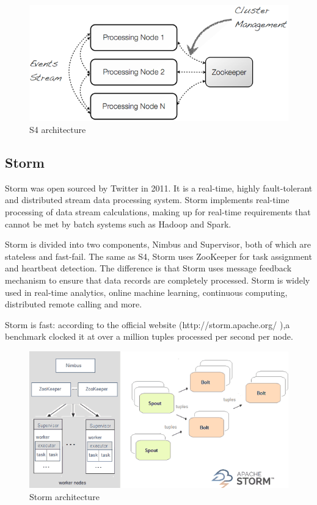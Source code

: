 \documentclass[journal]{IEEEtran}
\begin{document}
\begin{figure}
\includegraphics[width=\linewidth]{S4.png}
\caption{S4 architecture}
\label{S4}
\end{figure}

\subsection{Storm}

Storm was open sourced by Twitter in 2011. It is a real-time, highly fault-tolerant and distributed stream data processing system. Storm implements real-time processing of data stream calculations, making up for real-time requirements that cannot be met by batch systems such as Hadoop and Spark.

Storm is divided into two components, Nimbus and Supervisor, both of which are stateless and fast-fail. The same as S4, Storm uses ZooKeeper for task assignment and heartbeat detection. The difference is that Storm uses message feedback mechanism to ensure that data records are completely processed. Storm is widely used in real-time analytics, online machine learning, continuous computing, distributed remote calling and more.

Storm is fast: according to the official website (http://storm.apache.org/ ),a benchmark clocked it at over a million tuples processed per second per node. 
\begin{figure}
\includegraphics[width=\linewidth]{stormstreaming.png}
\caption{Storm architecture}
\label{Storm}
\end{figure}
\end{document}
